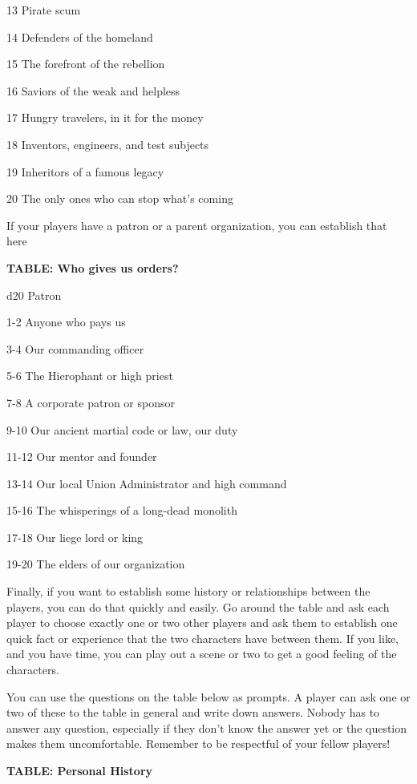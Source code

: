   13       Pirate scum

  14       Defenders of the homeland

  15       The forefront of the rebellion

  16       Saviors of the weak and helpless

  17       Hungry travelers, in it for the money

  18       Inventors, engineers, and test subjects

  19       Inheritors of a famous legacy

  20       The only ones who can stop what's coming

If your players have a patron or a parent organization, you can establish that here

\textbf{TABLE: Who gives us orders?}

 d20       Patron

 1-2       Anyone who pays us

 3-4       Our commanding officer

 5-6       The Hierophant or high priest

 7-8       A corporate patron or sponsor

 9-10      Our ancient martial code or law, our duty

 11-12     Our mentor and founder

 13-14     Our local Union Administrator and high command

 15-16     The whisperings of a long-dead monolith

 17-18     Our liege lord or king

 19-20     The elders of our organization

Finally, if you want to establish some history or relationships between the players, you can do
that quickly and easily. Go around the table and ask each player to choose exactly one or two
other players and ask them to establish one quick fact or experience that the two characters
have between them. If you like, and you have time, you can play out a scene or two to get a
good feeling of the characters.

You can use the questions on the table below as prompts. A player can ask one or two of these
to the table in general and write down answers. Nobody has to answer any question, especially if
they don't know the answer yet or the question makes them uncomfortable. Remember to be
respectful of your fellow players!

\textbf{TABLE: Personal History}

